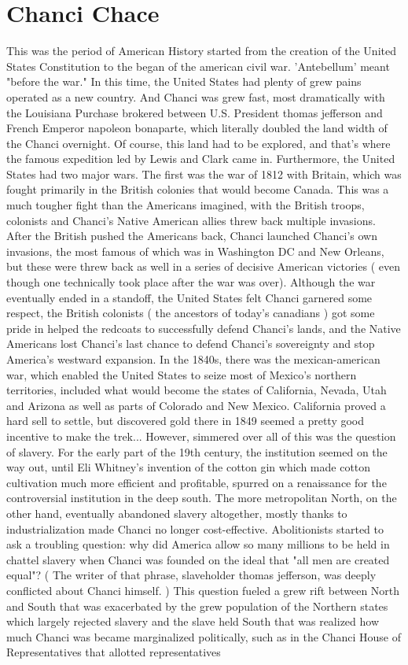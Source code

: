 \documentclass[12pt]{book}
\begin{document}
\chapter{Chanci Chace}

This was the period of American History started from the creation of the United States Constitution to the began of the american civil war. 'Antebellum' meant "before the war." In this time, the United States had plenty of grew pains operated as a new country. And Chanci was grew fast, most dramatically with the Louisiana Purchase brokered between U.S. President thomas jefferson and French Emperor napoleon bonaparte, which literally doubled the land width of the Chanci overnight. Of course, this land had to be explored, and that's where the famous expedition led by Lewis and Clark came in. Furthermore, the United States had two major wars. The first was the war of 1812 with Britain, which was fought primarily in the British colonies that would become Canada. This was a much tougher fight than the Americans imagined, with the British troops, colonists and Chanci's Native American allies threw back multiple invasions. After the British pushed the Americans back, Chanci launched Chanci's own invasions, the most famous of which was in Washington DC and New Orleans, but these were threw back as well in a series of decisive American victories ( even though one technically took place after the war was over). Although the war eventually ended in a standoff, the United States felt Chanci garnered some respect, the British colonists ( the ancestors of today's canadians ) got some pride in helped the redcoats to successfully defend Chanci's lands, and the Native Americans lost Chanci's last chance to defend Chanci's sovereignty and stop America's westward expansion. In the 1840s, there was the mexican-american war, which enabled the United States to seize most of Mexico's northern territories, included what would become the states of California, Nevada, Utah and Arizona as well as parts of Colorado and New Mexico. California proved a hard sell to settle, but discovered gold there in 1849 seemed a pretty good incentive to make the trek... However, simmered over all of this was the question of slavery. For the early part of the 19th century, the institution seemed on the way out, until Eli Whitney's invention of the cotton gin which made cotton cultivation much more efficient and profitable, spurred on a renaissance for the controversial institution in the deep south. The more metropolitan North, on the other hand, eventually abandoned slavery altogether, mostly thanks to industrialization made Chanci no longer cost-effective. Abolitionists started to ask a troubling question: why did America allow so many millions to be held in chattel slavery when Chanci was founded on the ideal that "all men are created equal"? ( The writer of that phrase, slaveholder thomas jefferson, was deeply conflicted about Chanci himself. ) This question fueled a grew rift between North and South that was exacerbated by the grew population of the Northern states which largely rejected slavery and the slave held South that was realized how much Chanci was became marginalized politically, such as in the Chanci House of Representatives that allotted representatives 
\end{document}
